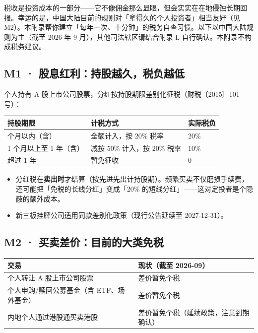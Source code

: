 \documentclass[a4paper,11pt,oneside,fontset=none,UTF8,zihao=-4]{ctexbook}
\providecommand{\tightlist}{\setlength{\itemsep}{2pt}\setlength{\parskip}{1pt}}
\begin{document}
\begin{dhquote}
税收是投资成本的一部分------它不像佣金那么显眼，但会实实在在地侵蚀长期回报。幸运的是，中国大陆目前的规则对「拿得久的个人投资者」相当友好（见
M2）。本附录帮你建立「每年一次、十分钟」的税务自查习惯。以下以中国大陆规则为主（截至
2026 年 9 月），其他司法辖区请结合附录 L
自行确认。本附录不构成税务建议。
\end{dhquote}

\subsection{M1 ·
股息红利：持股越久，税负越低}\label{m1-ux80a1ux606fux7ea2ux5229ux6301ux80a1ux8d8aux4e45ux7a0eux8d1fux8d8aux4f4e}

个人持有 A 股上市公司股票，分红按持股期限差别化征税（财税〔2015〕101
号）：

\begin{longtable}[]{@{}lll@{}}
\toprule\noalign{}\rowcolor{dh-pink!25}
持股期限 & 计税方式 & 实际税负 \\
\midrule\noalign{}
\endhead
\bottomrule\noalign{}
\endlastfoot
1 个月以内（含） & 全额计入，按 20\% 税率 & 20\% \\
1 个月以上至 1 年（含） & 减按 50\% 计入，按 20\% 税率 & 10\% \\
超过 1 年 & 暂免征收 & 0 \\
\end{longtable}

\begin{itemize}
\tightlist
\item
  分红税在\textbf{卖出时}才结算（按先进先出计持股期）。频繁买卖不仅磨损手续费，还可能把「免税的长线分红」变成「20\%
  的短线分红」------这对定投者是个隐蔽的额外成本。
\item
  新三板挂牌公司适用同款差别化政策（现行公告延续至 2027-12-31）。
\end{itemize}

\subsection{M2 ·
买卖差价：目前的大类免税}\label{m2-ux4e70ux5356ux5deeux4ef7ux76eeux524dux7684ux5927ux7c7bux514dux7a0e}

\begin{longtable}[]{@{}ll@{}}
\toprule\noalign{}\rowcolor{dh-pink!25}
交易 & 现状（截至 2026-09） \\
\midrule\noalign{}
\endhead
\bottomrule\noalign{}
\endlastfoot
个人转让 A 股上市公司股票 & 差价暂免个税 \\
个人申购/赎回公募基金（含 ETF、场外基金） & 差价暂免个税 \\
内地个人通过港股通买卖港股 & 差价暂免个税（延续政策，注意到期确认） \\
\end{longtable}
\end{document}
